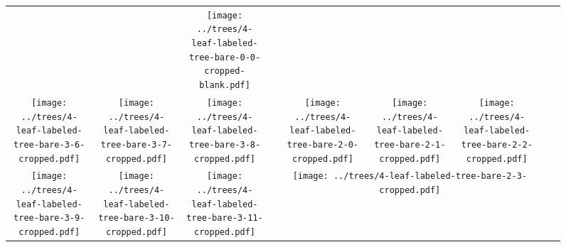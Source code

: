 \documentclass[border=10pt,varwidth=30cm]{standalone}
\newcommand{\pltwidth}{0.1}
\begin{document}
\begin{figure}
\begin{tabular}{@{}ccccccccc@{}}
        &
        &
        \texttt{[image: ../trees/4-leaf-labeled-tree-bare-0-0-cropped-blank.pdf]}
        \\
        \texttt{[image: ../trees/4-leaf-labeled-tree-bare-3-6-cropped.pdf]}
        &
        \texttt{[image: ../trees/4-leaf-labeled-tree-bare-3-7-cropped.pdf]}
        &
        \texttt{[image: ../trees/4-leaf-labeled-tree-bare-3-8-cropped.pdf]}
        &
        &
        \texttt{[image: ../trees/4-leaf-labeled-tree-bare-2-0-cropped.pdf]}
        &
        \texttt{[image: ../trees/4-leaf-labeled-tree-bare-2-1-cropped.pdf]}
        &
        \texttt{[image: ../trees/4-leaf-labeled-tree-bare-2-2-cropped.pdf]}
        &
        &
        \\
        \texttt{[image: ../trees/4-leaf-labeled-tree-bare-3-9-cropped.pdf]}
        &
        \texttt{[image: ../trees/4-leaf-labeled-tree-bare-3-10-cropped.pdf]}
        &
        \texttt{[image: ../trees/4-leaf-labeled-tree-bare-3-11-cropped.pdf]}
        &
        &
        \multicolumn{3}{c}{\texttt{[image: ../trees/4-leaf-labeled-tree-bare-2-3-cropped.pdf]}}
        &
        &
        \\
    \end{tabular}
\end{figure}
\end{document}
